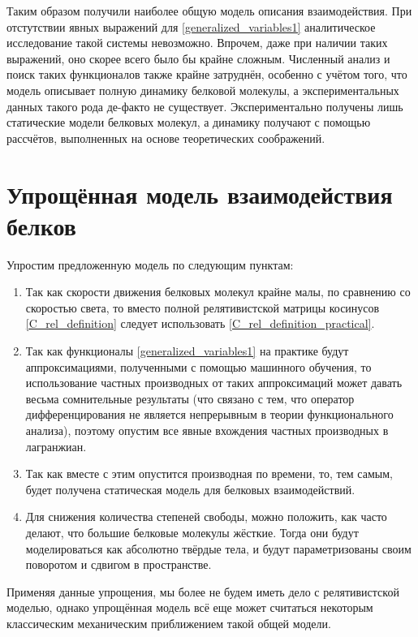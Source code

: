 Таким образом получили наиболее общую модель описания взаимодействия. При отстутствии явных выражений для \ref{generalized_variables1} аналитическое исследование такой системы невозможно. Впрочем, даже при наличии таких выражений, оно скорее всего было бы крайне сложным. Численный анализ и поиск таких функционалов также крайне затруднён, особенно с учётом того, что модель описывает полную динамику белковой молекулы, а экспериментальных данных такого рода де-факто не существует. Экспериментально получены лишь статические модели белковых молекул, а динамику получают с помощью рассчётов, выполненных на основе теоретических соображений.

\section{Упрощённая модель взаимодействия белков}
Упростим предложенную модель по следующим пунктам:
\begin{enumerate}
\item Так как скорости движения белковых молекул крайне малы, по сравнению со скоростью света, то вместо полной релятивистской матрицы косинусов \ref{C_rel_definition} следует
использовать \ref{C_rel_definition_practical}.
\item Так как функционалы \ref{generalized_variables1} на практике будут аппроксимациями, полученными с помощью машинного обучения, то использование частных
производных от таких аппроксимаций может давать весьма сомнительные результаты (что связано с тем, что оператор дифференцирования не является непрерывным в теории функционального анализа), поэтому
опустим все явные вхождения частных производных в лагранжиан.
\item Так как вместе с этим опустится производная по времени, то, тем самым, будет получена статическая модель для белковых взаимодействий.
\item Для снижения количества степеней свободы, можно положить, как часто делают, что большие белковые молекулы жёсткие. Тогда они будут моделироваться как
абсолютно твёрдые тела, и будут параметризованы своим поворотом и сдвигом в пространстве.
\end{enumerate}
Применяя данные упрощения, мы более не будем иметь дело с релятивистской моделью, однако упрощённая модель всё еще может считаться некоторым
классическим механическим приближением такой общей модели.

